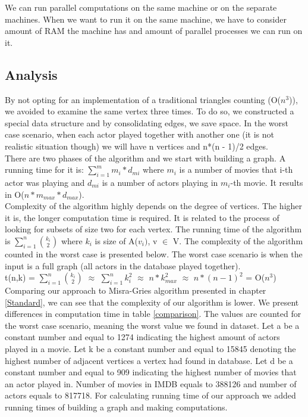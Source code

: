 We can run parallel computations on the same machine or on the separate machines. When we want to run it on the same machine, we have to consider amount of RAM the machine has and amount of parallel processes we can run on it.

\subsection{Analysis}
\label{OurAlgorithmAnalysis}
By not opting for an implementation of a traditional triangles counting (O(\(n^3\))), we avoided to examine the same vertex three times. To do so, we constructed a special data structure and by consolidating edges, we save space.
In the worst case scenario, when each actor played together with another one (it is not realistic situation though) we will have n vertices and n*(n - 1)/2 edges.
\\
There are two phases of the algorithm and we start with building a graph. A running time for it is: \(\sum\limits_{i=1}^m{m_i * d_{mi}}\) where \(m_i\) is a number of movies that i-th actor was playing and \(d_{mi}\) is a number of actors playing in \(m_i\)-th movie. It results in O(\(n*m_{max}*d_{max}\)).
\\
Complexity of the algorithm highly depends on the degree of vertices. The higher it is, the longer computation time is required. It is related to the process of looking for subsets of size two for each vertex. The running time of the algorithm is \(\sum\limits_{i=1}^n{k_i \choose 2}\) where \(k_i\) is size of A(\(v_i)\), v \(\in\) V. The complexity of the algorithm counted in the worst case is presented below. The worst case scenario is when the input is a full graph (all actors in the database played together).
\\
t(n,k) = \(\sum\limits_{i=1}^n{k_i \choose 2}\) \(\approx\) \(\sum\limits_{i=1}^n{k_i^2}\) \(\approx\) \(n*k_{max}^2\) \(\approx\) \(n*(n-1)^2\) = O(\(n^3\))
\\
Comparing our approach to Misra-Gries algorithm presented in chapter \ref{Standard}, we can see that the complexity of our algorithm is lower. We present differences in computation time in table \ref{comparison}. The values are counted for the worst case scenario, meaning the worst value we found in dataset. Let a be a constant number and equal to 1274 indicating the highest amount of actors played in a movie. Let k be a constant number and equal to 15845 denoting the highest number of adjacent vertices a vertex had found in database. Let d be a constant number and equal to 909 indicating the highest number of movies that an actor played in. Number of movies in IMDB equals to 388126 and number of actors equals to 817718. For calculating running time of our approach we added running times of building a graph and making computations.
